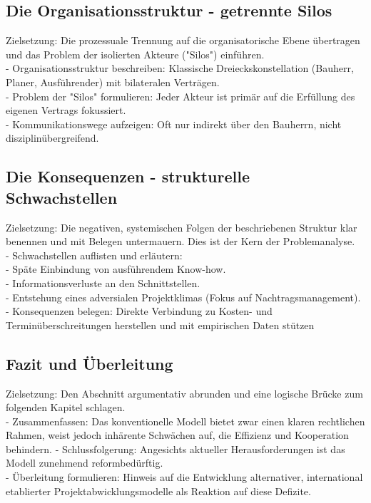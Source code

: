 \subsection{Die Organisationsstruktur - getrennte Silos}
\label{sec: 2.1.3}
Zielsetzung: Die prozessuale Trennung auf die organisatorische Ebene übertragen und das Problem der isolierten Akteure ("Silos") einführen.\\
- Organisationsstruktur beschreiben: Klassische Dreieckskonstellation (Bauherr, Planer, Ausführender) mit bilateralen Verträgen.\\
- Problem der "Silos" formulieren: Jeder Akteur ist primär auf die Erfüllung des eigenen Vertrags fokussiert.\\
- Kommunikationswege aufzeigen: Oft nur indirekt über den Bauherrn, nicht disziplinübergreifend.\\

\subsection{Die Konsequenzen - strukturelle Schwachstellen}
\label{sec: 2.1.4}
Zielsetzung: Die negativen, systemischen Folgen der beschriebenen Struktur klar benennen und mit Belegen untermauern. Dies ist der Kern der Problemanalyse.\\
- Schwachstellen auflisten und erläutern:\\
- Späte Einbindung von ausführendem Know-how.\\
- Informationsverluste an den Schnittstellen.\\
- Entstehung eines adversialen Projektklimas (Fokus auf Nachtragsmanagement).\\
- Konsequenzen belegen: Direkte Verbindung zu Kosten- und Terminüberschreitungen herstellen und mit empirischen Daten stützen\\

\subsection{Fazit und Überleitung}
\label{sec: 2.1.5}
Zielsetzung: Den Abschnitt argumentativ abrunden und eine logische Brücke zum folgenden Kapitel schlagen.\\

- Zusammenfassen: Das konventionelle Modell bietet zwar einen klaren rechtlichen Rahmen, weist jedoch inhärente Schwächen auf, die Effizienz und Kooperation behindern.
- Schlussfolgerung: Angesichts aktueller Herausforderungen ist das Modell zunehmend reformbedürftig.\\
- Überleitung formulieren: Hinweis auf die Entwicklung alternativer, international etablierter Projektabwicklungsmodelle als Reaktion auf diese Defizite.

